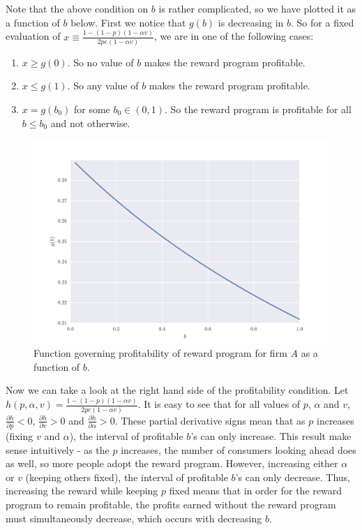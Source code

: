 Note that the above condition on $b$ is rather complicated, so we have plotted it as a function of $b$ below. First we notice that $g(b)$ is decreasing in $b$. So for a fixed evaluation of $x \equiv \frac{1-(1-p)(1-\alpha v)}{2pe(1-\alpha v)}$, we are in one of the following cases:
\begin{enumerate}
\item
$x \geq g(0)$. So no value of $b$ makes the reward program profitable.
\item
$x \leq g(1)$. So any value of $b$ makes the reward program profitable.
\item
$x = g(b_0)$ for some $b_0 \in (0,1)$. So the reward program is profitable for all $b \leq b_0$ and not otherwise.
\end{enumerate}

\begin{figure}[h!]
\begin{centering}
\includegraphics[scale = 0.75]{./figures/b_plot.pdf}
\caption{Function governing profitability of reward program for firm $A$ as a function of $b$.}
\label{fig:b_plot}
\end{centering}
\end{figure}

Now we can take a look at the right hand side of the profitability condition. Let $h(p, \alpha, v) = \frac{1-(1-p)(1-\alpha v)}{2pe(1-\alpha v)}$. It is easy to see that for all values of $p$, $\alpha$ and $v$, $\frac{\partial h}{\partial p} < 0$, $\frac{\partial h}{\partial v} > 0$ and $\frac{\partial h}{\partial \alpha} > 0$. These partial derivative signs mean that as $p$ increases (fixing $v$ and $\alpha$), the interval of profitable $b$'s can only increase. This result make sense intuitively - as the $p$ increases, the number of consumers looking ahead does as well, so more people adopt the reward program. However, increasing either $\alpha$ or $v$ (keeping others fixed), the interval of profitable $b$'s can only decrease. Thus, increasing the reward while keeping $p$ fixed means that in order for the reward program to remain profitable, the profits earned without the reward program must simultaneously decrease, which occurs with decreasing $b$.
